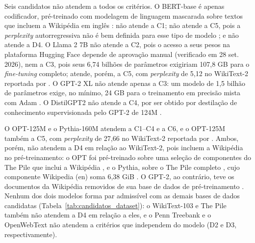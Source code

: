 Seis candidatos não atendem a todos os critérios. O BERT-base é apenas codificador,
pré-treinado com modelagem de linguagem mascarada sobre textos que incluem a Wikipédia em
inglês \cite{Devlin2019}: não atende a C1; não atende a C5, pois a \textit{perplexity}
autorregressiva não é bem definida para esse tipo de modelo \cite{HuggingFacePerplexity}; e
não atende a D4. O Llama 2 7B não atende a C2, pois o acesso a seus pesos na plataforma
Hugging Face depende de aprovação manual (verificado em 28 set. 2026), nem a C3, pois seus
6,74 bilhões de parâmetros exigiriam 107,8 GB para o \textit{fine-tuning} completo; atende,
porém, a C5, com \textit{perplexity} de 5,12 no WikiText-2 reportada por
. O GPT-2 XL não atende apenas a C3: um modelo de 1,5 bilhão de
parâmetros exige, no mínimo, 24 GB para o treinamento em precisão mista com Adam
\cite{Rajbhandari2020}. O DistilGPT2 não atende a C4, por ser obtido por destilação de
conhecimento supervisionada pelo GPT-2 de 124M \cite{Sanh2019}.

O OPT-125M e o Pythia-160M atendem a C1--C4 e a C6, e o OPT-125M também a C5, com
\textit{perplexity} de 27,66 no WikiText-2 reportada por . Ambos,
porém, não atendem a D4 em relação ao WikiText-2, pois incluem a Wikipédia no
pré-treinamento: o OPT foi pré-treinado sobre uma seleção de componentes do The Pile que
inclui a Wikipédia \cite{Zhang2022}, e o Pythia, sobre o The Pile completo
\cite{Biderman2023}, cujo componente Wikipedia (en) soma 6,38 GiB \cite{Gao2020}. O GPT-2,
ao contrário, teve os documentos da Wikipédia removidos de sua base de dados de
pré-treinamento \cite{Radford2019}. Nenhum dos dois modelos forma par admissível com as
demais bases de dados candidatas (Tabela~\ref{tab:candidatos_dataset}): o WikiText-103 e
The Pile também não atendem a D4 em relação a eles, e o Penn Treebank e o OpenWebText não
atendem a critérios que independem do modelo (D2 e D3, respectivamente).

